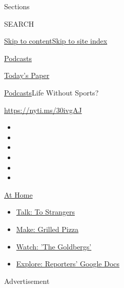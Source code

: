 Sections

SEARCH

\protect\hyperlink{site-content}{Skip to
content}\protect\hyperlink{site-index}{Skip to site index}

\href{https://www.nytimes.com/spotlight/podcasts}{Podcasts}

\href{https://myaccount.nytimes.com/auth/login?response_type=cookie\&client_id=vi}{}

\href{https://www.nytimes.com/section/todayspaper}{Today's Paper}

\href{/spotlight/podcasts}{Podcasts}\textbar{}Life Without Sports?

\url{https://nyti.ms/30ivgAJ}

\begin{itemize}
\item
\item
\item
\item
\item
\item
\end{itemize}

\href{https://www.nytimes.com/spotlight/at-home?action=click\&pgtype=Article\&state=default\&region=TOP_BANNER\&context=at_home_menu}{At
Home}

\begin{itemize}
\tightlist
\item
  \href{https://www.nytimes.com/2020/08/03/well/family/the-benefits-of-talking-to-strangers.html?action=click\&pgtype=Article\&state=default\&region=TOP_BANNER\&context=at_home_menu}{Talk:
  To Strangers}
\item
  \href{https://www.nytimes.com/2020/08/01/at-home/coronavirus-make-pizza-on-a-grill.html?action=click\&pgtype=Article\&state=default\&region=TOP_BANNER\&context=at_home_menu}{Make:
  Grilled Pizza}
\item
  \href{https://www.nytimes.com/2020/07/31/arts/television/goldbergs-abc-stream.html?action=click\&pgtype=Article\&state=default\&region=TOP_BANNER\&context=at_home_menu}{Watch:
  'The Goldbergs'}
\item
  \href{https://www.nytimes.com/interactive/2020/at-home/even-more-reporters-editors-diaries-lists-recommendations.html?action=click\&pgtype=Article\&state=default\&region=TOP_BANNER\&context=at_home_menu}{Explore:
  Reporters' Google Docs}
\end{itemize}

Advertisement

